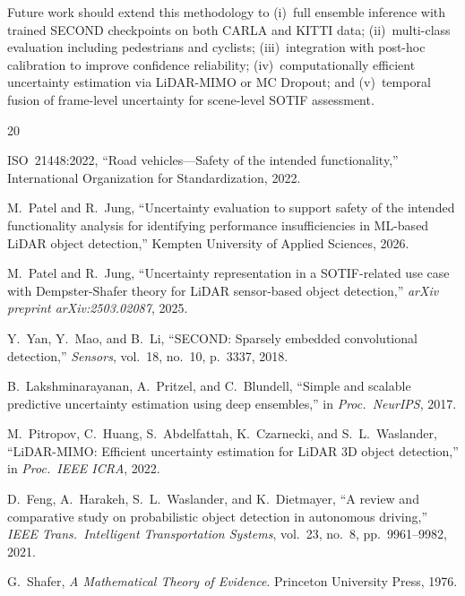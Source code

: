 \documentclass[conference]{IEEEtran}
\begin{document}
Future work should extend this methodology to (i)~full ensemble inference with trained SECOND checkpoints on both CARLA and KITTI data; (ii)~multi-class evaluation including pedestrians and cyclists; (iii)~integration with post-hoc calibration to improve confidence reliability; (iv)~computationally efficient uncertainty estimation via LiDAR-MIMO or MC Dropout; and (v)~temporal fusion of frame-level uncertainty for scene-level SOTIF assessment.




\begin{thebibliography}{20}

ISO~21448:2022, ``Road vehicles---Safety of the intended functionality,'' International Organization for Standardization, 2022.

M.~Patel and R.~Jung, ``Uncertainty evaluation to support safety of the intended functionality analysis for identifying performance insufficiencies in ML-based LiDAR object detection,'' Kempten University of Applied Sciences, 2026.

M.~Patel and R.~Jung, ``Uncertainty representation in a SOTIF-related use case with Dempster-Shafer theory for LiDAR sensor-based object detection,'' \emph{arXiv preprint arXiv:2503.02087}, 2025.

Y.~Yan, Y.~Mao, and B.~Li, ``SECOND: Sparsely embedded convolutional detection,'' \emph{Sensors}, vol.~18, no.~10, p.~3337, 2018.

B.~Lakshminarayanan, A.~Pritzel, and C.~Blundell, ``Simple and scalable predictive uncertainty estimation using deep ensembles,'' in \emph{Proc.\ NeurIPS}, 2017.

M.~Pitropov, C.~Huang, S.~Abdelfattah, K.~Czarnecki, and S.~L.~Waslander, ``LiDAR-MIMO: Efficient uncertainty estimation for LiDAR 3D object detection,'' in \emph{Proc.\ IEEE ICRA}, 2022.

D.~Feng, A.~Harakeh, S.~L.~Waslander, and K.~Dietmayer, ``A review and comparative study on probabilistic object detection in autonomous driving,'' \emph{IEEE Trans.\ Intelligent Transportation Systems}, vol.~23, no.~8, pp.~9961--9982, 2021.

G.~Shafer, \emph{A Mathematical Theory of Evidence}. Princeton University Press, 1976.


\end{thebibliography}
\end{document}
